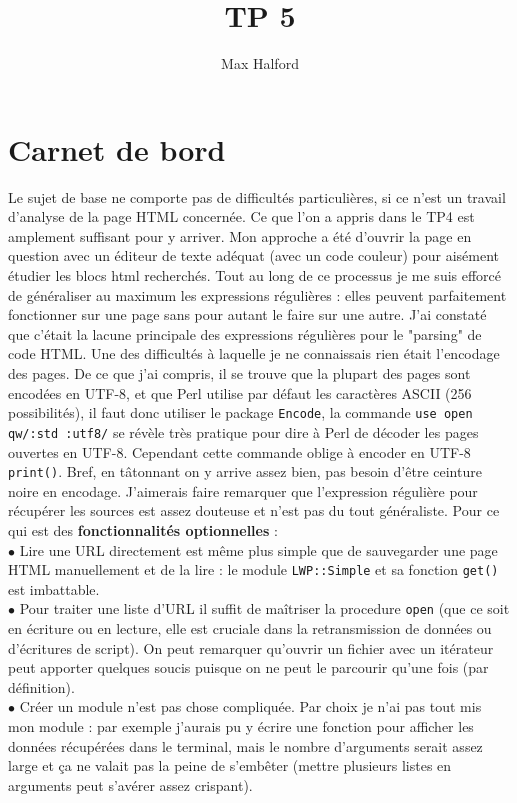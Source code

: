 \documentclass[11pt]{article}
\title{\textbf{TP 5}}
\author{Max Halford}
\date{}
\begin{document}
\maketitle

\section{Carnet de bord}
Le sujet de base ne comporte pas de difficultés particulières, si ce n'est un travail d'analyse de la page HTML concernée. Ce que l'on a appris dans le TP4 est amplement suffisant pour y arriver. Mon approche a été d'ouvrir la page en question avec un éditeur de texte adéquat (avec un code couleur) pour aisément étudier les blocs html recherchés. Tout au long de ce processus je me suis efforcé de généraliser au maximum les expressions régulières : elles peuvent parfaitement fonctionner sur une page sans pour autant le faire sur une autre. J'ai constaté que c'était la lacune principale des expressions régulières pour le "parsing" de code HTML. Une des difficultés à laquelle je ne connaissais rien était l'encodage des pages. De ce que j'ai compris, il se trouve que la plupart des pages sont encodées en UTF-8, et que Perl utilise par défaut les caractères ASCII (256 possibilités), il faut donc utiliser le package \texttt{Encode}, la commande \texttt{use open qw/:std :utf8/} se révèle très pratique pour dire à Perl de décoder les pages ouvertes en UTF-8. Cependant cette commande oblige à encoder en UTF-8 \texttt{print()}. Bref, en tâtonnant on y arrive assez bien, pas besoin d'être ceinture noire en encodage. J'aimerais faire remarquer que l'expression régulière pour récupérer les sources est assez douteuse et n'est pas du tout généraliste.
\bigskip
\newline
\bigskip
Pour ce qui est des \textbf{fonctionnalités optionnelles} :
\\ $\bullet$ Lire une URL directement est même plus simple que de sauvegarder une page HTML manuellement et de la lire : le module \texttt{LWP::Simple} et sa fonction \texttt{get()} est imbattable.
\\ $\bullet$ Pour traiter une liste d'URL il suffit de maîtriser la procedure \texttt{open} (que ce soit en écriture ou en lecture, elle est cruciale dans la retransmission de données ou d'écritures de script). On peut remarquer qu'ouvrir un fichier avec un itérateur peut apporter quelques soucis puisque on ne peut le parcourir qu'une fois (par définition).
\\ $\bullet$ Créer un module n'est pas chose compliquée. Par choix je n'ai pas tout mis mon module : par exemple j'aurais pu y écrire une fonction pour afficher les données récupérées dans le terminal, mais le nombre d'arguments serait assez large et ça ne valait pas la peine de s'embêter (mettre plusieurs listes en arguments peut s'avérer assez crispant).
\end{document}
